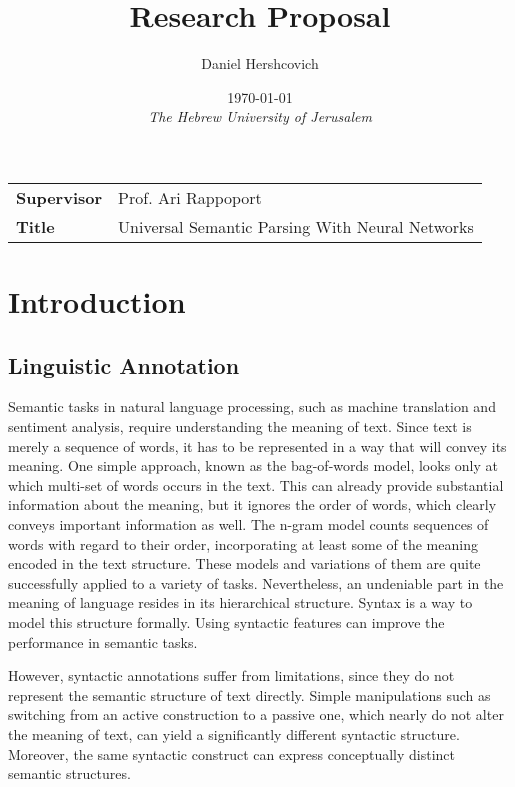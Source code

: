 \documentclass[11pt]{article}
\title{Research Proposal}
\author{Daniel Hershcovich}
\date{\today \\ \textit{The Hebrew University of Jerusalem}}
\begin{document}
\maketitle

\begin{table}[!th]
\begin{tabular}{>{\bfseries}l p{}}
Supervisor & Prof. Ari Rappoport \\
Title & Universal Semantic Parsing With Neural Networks
\end{tabular}
\end{table}


\section{Introduction}\label{sec:introduction}

\subsection{Linguistic Annotation}

Semantic tasks in natural language processing, such as machine translation and
sentiment analysis, require understanding the meaning of text. Since text is
merely a sequence of words, it has to be represented in a way that will convey
its meaning. One simple approach, known as the bag-of-words model, looks only
at which multi-set of words occurs in the text. This can already provide
substantial information about the meaning, but it ignores the order of words,
which clearly conveys important information as well. The n-gram model counts
sequences of words with regard to their order, incorporating at least some of
the meaning encoded in the text structure. These models and variations of them
are quite successfully applied to a variety of
tasks\cite{mikolov2013efficient}. Nevertheless, an undeniable part in the
meaning of language resides in its hierarchical structure. Syntax is a way to
model this structure formally. Using syntactic features can improve the
performance in semantic tasks\cite{vandeghinste2013parse}.

However, syntactic annotations suffer from limitations, since they do not
represent the semantic structure of text directly. Simple manipulations such as
switching from an active construction to a passive one, which nearly do not
alter the meaning of text, can yield a significantly different syntactic
structure. Moreover, the same syntactic construct can express conceptually
distinct semantic structures\cite{abend2013ucca}.
\end{document}
